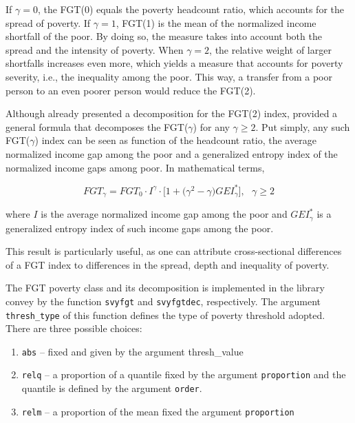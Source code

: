 \documentclass[
]{book}
\providecommand{\tightlist}{%
  \setlength{\itemsep}{0pt}\setlength{\parskip}{0pt}}
\begin{document}
If \(\gamma =0\), the FGT(0) equals the poverty headcount ratio, which accounts for the spread of poverty. If \(\gamma =1\), FGT(1) is the mean of the normalized income shortfall of the poor. By doing so, the measure takes into account both the spread and the intensity of poverty. When \(\gamma =2\), the relative weight of larger shortfalls increases even more, which yields a measure that accounts for poverty severity, i.e., the inequality among the poor. This way, a transfer from a poor person to an even poorer person would reduce the FGT(2).

Although \textcite{foster1984} already presented a decomposition for the FGT(2) index, \textcite{aristondo2010} provided a general formula that decomposes the FGT(\(\gamma\)) for any \(\gamma \geqslant 2\). Put simply, any such FGT(\(\gamma\)) index can be seen as function of the headcount ratio, the average normalized income gap among the poor and a generalized entropy index of the normalized income gaps among poor. In mathematical terms,

\[
FGT_\gamma = FGT_0 \cdot I^\gamma \cdot \big[ 1 + \big( \gamma^2 -\gamma \big) GEI_\gamma^* \big] , \text{ } \gamma \geq 2
\]

where \(I\) is the average normalized income gap among the poor and \(GEI_\gamma^*\) is a generalized entropy index of such income gaps among the poor.

This result is particularly useful, as one can attribute cross-sectional differences of a FGT index to differences in the spread, depth and inequality of poverty.

The FGT poverty class and its decomposition is implemented in the library convey by the function \texttt{svyfgt} and \texttt{svyfgtdec}, respectively.
The argument \texttt{thresh\_type} of this function defines the type of poverty threshold adopted.
There are three possible choices:

\begin{enumerate}
\def\labelenumi{\arabic{enumi}.}
\tightlist
\item
  \texttt{abs} -- fixed and given by the argument thresh\_value
\item
  \texttt{relq} -- a proportion of a quantile fixed by the argument \texttt{proportion} and the quantile is defined by the argument \texttt{order}.
\item
  \texttt{relm} -- a proportion of the mean fixed the argument \texttt{proportion}
\end{enumerate}
\end{document}
